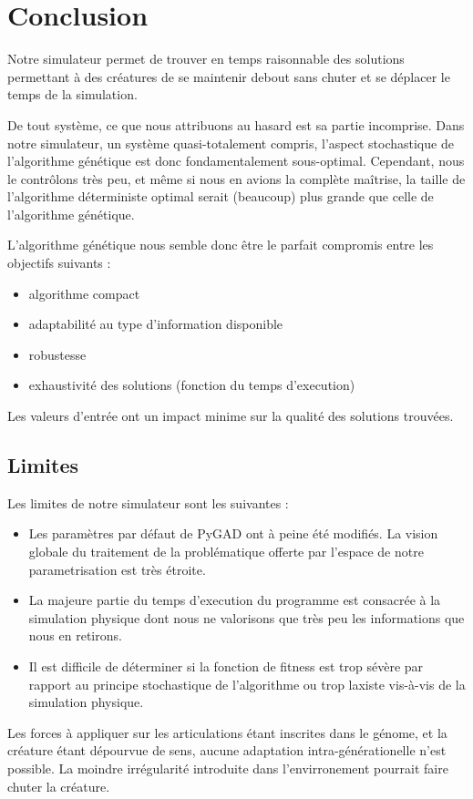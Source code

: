 \documentclass[journal, a4paper]{IEEEtran}
\begin{document}
\section{Conclusion}\label{sec:conclusion}
	Notre simulateur permet de trouver en temps raisonnable des
	solutions permettant à des créatures de se maintenir debout sans
	chuter et se déplacer le temps de la simulation.

	De tout système, ce que nous attribuons au hasard est sa partie
	incomprise.
	Dans notre simulateur, un système quasi-totalement compris,
	l'aspect stochastique	de
	l'algorithme génétique est donc fondamentalement sous-optimal.
	Cependant, nous le contrôlons très peu, et même si nous en avions
	la
	complète maîtrise, la taille de l'algorithme déterministe optimal
	serait (beaucoup) plus grande que celle de l'algorithme génétique.

	L'algorithme génétique nous semble donc être le parfait compromis
	entre les objectifs suivants :
	\begin{itemize}
		\item algorithme compact
		\item adaptabilité au type d'information disponible
		\item robustesse
		\item exhaustivité des solutions (fonction du temps d'execution)
	\end{itemize}

	Les valeurs d'entrée ont un impact minime sur la qualité
	des solutions trouvées.

\subsection{Limites}\label{subsec:limites}
	Les limites de notre simulateur sont les suivantes :
	\begin{itemize}
		\item Les paramètres par défaut de PyGAD ont à peine été
		modifiés. La vision globale du traitement de la problématique
		offerte par l'espace de notre parametrisation est très étroite.
		\item La majeure partie du temps d'execution du programme est
		consacrée à la simulation physique dont nous ne valorisons que
		très peu les informations que nous en retirons.
		\item Il est difficile de déterminer si la fonction de
		fitness
		est trop sévère par rapport au principe stochastique de l'algorithme
		ou trop laxiste vis-à-vis de la simulation physique.
	\end{itemize}
	Les forces à appliquer sur les articulations étant inscrites dans
	le génome, et la créature étant dépourvue de sens, aucune adaptation
	intra-générationelle n'est possible.
	La moindre irrégularité introduite dans l'envirronement
	pourrait faire chuter la créature.
\end{document}

